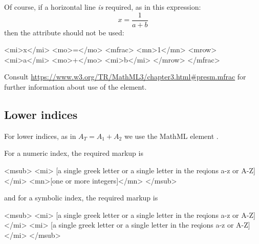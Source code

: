 \documentclass[english,a4paper,11pt]{article}
\begin{document}
Of course, if a horizontal line \emph{is} required, as in this expression:
\[
x = \frac{1}{a + b}
\]
then the  attribute should not be used:
\begin{kodeblokk}
\begin{verbatimtab}[3]
<mi>x</mi>
<mo>=</mo>
<mfrac>
	<mn>1</mn>
	<mrow>
		<mi>a</mi>
		<mo>+</mo>
		<mi>b</mi>
	</mrow>
</mfrac>
\end{verbatimtab}
\end{kodeblokk}


\bigskip
Consult \url{https://www.w3.org/TR/MathML3/chapter3.html#presm.mfrac} for further information about use of the  element. 



\subsection{Lower indices}

For lower indices, as in $A_T = A_1 + A_2$ we use the MathML element .

For a numeric index, the required markup is 
\begin{kodeblokk}
\begin{verbatimtab}[3]
<msub>
	<mi>
		[a single greek letter 
		or 
		a single letter in the reqions a-z or A-Z]
	</mi>
	<mn>[one or more integers]</mn>
</msub>
\end{verbatimtab}
\end{kodeblokk}
and for a symbolic index, the required markup is 
\begin{kodeblokk}
\begin{verbatimtab}[3]
<msub>
	<mi>
		[a single greek letter 
		or 
		a single letter in the reqions a-z or A-Z]
	</mi>
	<mi>
		[a single greek letter 
		or 
		a single letter in the reqions a-z or A-Z]
	</mi>
</msub>
\end{verbatimtab}
\end{kodeblokk}
\end{document}
